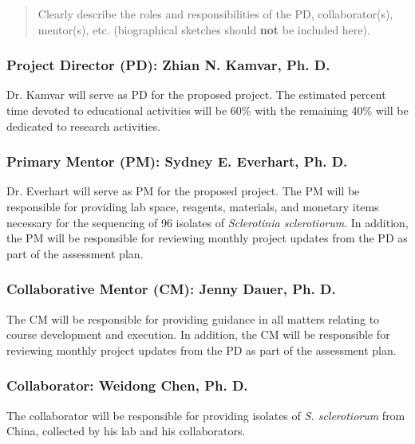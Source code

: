 \documentclass[12pt,letterpaper]{article}
\title{\ruleline{Key Personnel}}
\begin{document}
\maketitle

\begin{quote}
Clearly describe the roles and responsibilities of the PD, collaborator(s), mentor(s), etc.
(biographical sketches should \textbf{not} be included here).
\end{quote}

\subsubsection{Project Director (PD): Zhian N. Kamvar, Ph. D.}

\noindent Dr. Kamvar will serve as PD for the proposed project. The estimated percent time devoted to educational activities will be 60\% with the remaining 40\% will be dedicated to research activities. 

\subsubsection{Primary Mentor (PM): Sydney E. Everhart, Ph. D.}

\noindent Dr. Everhart will serve as PM for the proposed project. 
The PM will be responsible for providing lab space, reagents, materials, and monetary items necessary for the sequencing of 96 isolates of \textit{Sclerotinia sclerotiorum}. 
In addition, the PM will be responsible for reviewing monthly project updates from the PD as part of the assessment plan. 

\subsubsection{Collaborative Mentor (CM): Jenny Dauer, Ph. D.}
The CM will be responsible for providing guidance in all matters relating to course development and execution. 
In addition, the CM will be responsible for reviewing monthly project updates from the PD as part of the assessment plan.

\subsubsection{Collaborator: Weidong Chen, Ph. D.}
The collaborator will be responsible for providing isolates of \textit{S. sclerotiorum} from China, collected by his lab and his collaborators.
\end{document}
